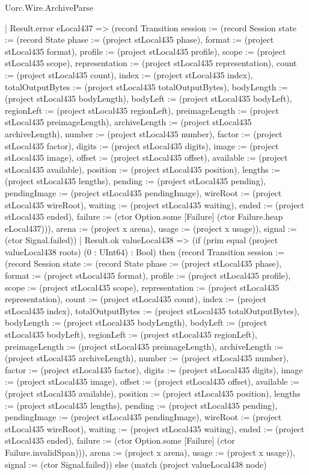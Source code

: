 \begin{lexlean}{Uorc.Wire.ArchiveParse}
\begin{semanticmodule}
{      | Result.error eLocal437 => (record Transition {session := (record Session {state := (record State {phase := (project stLocal435 phase), format := (project stLocal435 format), profile := (project stLocal435 profile), scope := (project stLocal435 scope), representation := (project stLocal435 representation), count := (project stLocal435 count), index := (project stLocal435 index), totalOutputBytes := (project stLocal435 totalOutputBytes), bodyLength := (project stLocal435 bodyLength), bodyLeft := (project stLocal435 bodyLeft), regionLeft := (project stLocal435 regionLeft), preimageLength := (project stLocal435 preimageLength), archiveLength := (project stLocal435 archiveLength), number := (project stLocal435 number), factor := (project stLocal435 factor), digits := (project stLocal435 digits), image := (project stLocal435 image), offset := (project stLocal435 offset), available := (project stLocal435 available), position := (project stLocal435 position), lengths := (project stLocal435 lengths), pending := (project stLocal435 pending), pendingImage := (project stLocal435 pendingImage), wireRoot := (project stLocal435 wireRoot), waiting := (project stLocal435 waiting), ended := (project stLocal435 ended), failure := (ctor Option.some [Failure] (ctor Failure.heap eLocal437))}), arena := (project x arena), usage := (project x usage)}), signal := (ctor Signal.failed)})
      | Result.ok valueLocal438 => (if (prim equal (project valueLocal438 roots) (0 : UInt64) : Bool) then (record Transition {session := (record Session {state := (record State {phase := (project stLocal435 phase), format := (project stLocal435 format), profile := (project stLocal435 profile), scope := (project stLocal435 scope), representation := (project stLocal435 representation), count := (project stLocal435 count), index := (project stLocal435 index), totalOutputBytes := (project stLocal435 totalOutputBytes), bodyLength := (project stLocal435 bodyLength), bodyLeft := (project stLocal435 bodyLeft), regionLeft := (project stLocal435 regionLeft), preimageLength := (project stLocal435 preimageLength), archiveLength := (project stLocal435 archiveLength), number := (project stLocal435 number), factor := (project stLocal435 factor), digits := (project stLocal435 digits), image := (project stLocal435 image), offset := (project stLocal435 offset), available := (project stLocal435 available), position := (project stLocal435 position), lengths := (project stLocal435 lengths), pending := (project stLocal435 pending), pendingImage := (project stLocal435 pendingImage), wireRoot := (project stLocal435 wireRoot), waiting := (project stLocal435 waiting), ended := (project stLocal435 ended), failure := (ctor Option.some [Failure] (ctor Failure.invalidSpan))}), arena := (project x arena), usage := (project x usage)}), signal := (ctor Signal.failed)}) else (match (project valueLocal438 node)
}
\end{semanticmodule}
\end{lexlean}
